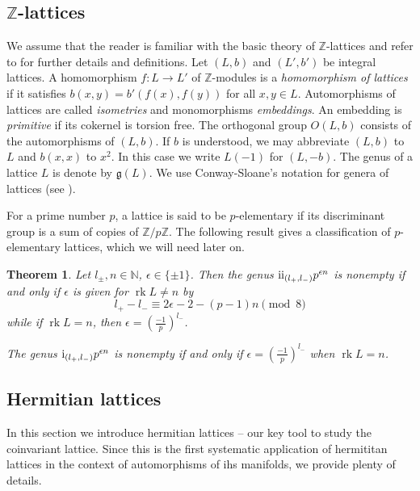 \documentclass{amsart}
\theoremstyle{definition}
\theoremstyle{plain}
\newtheorem{theorem}[definition]{Theorem}
\DeclareMathOperator{\rk}{rk}
\newcommand{\ZZ}{\mathbb{Z}}
\newcommand{\NN}{\mathbb{N}}
\newcommand{\RN}[1]{\textup{\uppercase\expandafter{\romannumeral#1}}}
\newcommand{\even}{\RN{2}}
\newcommand{\odd}{\RN{1}}
\newcommand{\leg}[2]{\left( \frac{#1}{#2}\right)}
\begin{document}
\subsection{\texorpdfstring{$\ZZ$}{Z}-lattices}
We assume that the reader is familiar with the basic theory of $\ZZ$-lattices and refer to \cite{nikulin,conway_sloane,kneser} for further details and
definitions.
Let $(L,b)$ and $(L',b')$ be integral lattices. A homomorphism
$f \colon L \rightarrow L'$ of $\ZZ$-modules is a \emph{homomorphism of
lattices} if it satisfies $b(x,y)=b'(f(x),f(y))$ for all
$x,y \in L$. Automorphisms of lattices are called \emph{isometries} and monomorphisms \emph{embeddings}. An embedding is \emph{primitive} if its cokernel is torsion free.
The orthogonal group $O(L,b)$ consists of the
automorphisms of $(L,b)$.
If $b$ is understood, we may abbreviate $(L,b)$ to $L$ and $b(x,x)$ to $x^2$.
In this case we write $L(-1)$ for $(L,-b)$. The genus of a lattice $L$ is denote by $\mathfrak{g}(L)$. We use Conway-Sloane's notation for genera of lattices (see \cite[Ch.\ 15]{conway_sloane}).

For a prime number $p$, a lattice is said to be $p$-elementary if its discriminant group is a sum of copies of $\ZZ/p\ZZ$. The following result gives a classification of $p$-elementary lattices, which we will need later on.
\begin{theorem}\cite[Ch.\ 15, Thm.\ 13]{conway_sloane}\label{thm:p-elementary}
Let $l_{\pm},n \in \NN$, $\epsilon \in \{\pm 1\}$.
Then the genus $\even_{(l_+,l_-)}p^{\epsilon n}$ is nonempty if and only if
$\epsilon$ is given for $\rk L \neq n$ by
\begin{equation}\label{eqn:p-sign}
 l_+ - l_- \equiv 2 \epsilon -2 -(p-1)n \pmod{8}
\end{equation}
 while if $\rk L =n$, then $\epsilon = \leg{-1}{p}^{l_-}$.
 
 The genus $\odd_{(l_+,l_-)}p^{\epsilon n}$ is nonempty if and only if
   $\epsilon=\leg{-1}{p}^{l_-}$ when $\rk L =n$.
\end{theorem}

\subsection{Hermitian lattices}
In this section we introduce hermitian lattices -- our key tool to study the coinvariant lattice.
Since this is the first systematic application of hermititan lattices in the context of automorphisms of ihs manifolds, we provide plenty of details.
\end{document}
